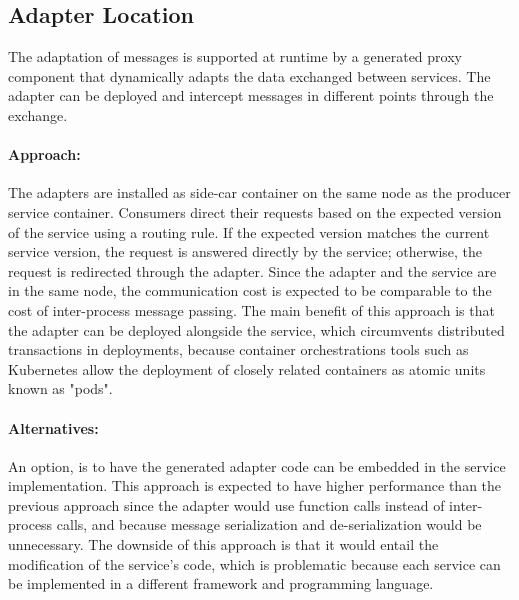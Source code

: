 \subsection{Adapter Location} %
\label{sec:adapter_location}

The adaptation of messages is supported at runtime by a generated proxy component
that dynamically adapts the data exchanged between services.
The adapter can be deployed and intercept messages in different points through the exchange.

\paragraph{Approach:}
The adapters are installed as side-car container on the same node as the producer service container.
Consumers direct their requests based on the expected version of the service using a routing rule.
If the expected version matches the current service version, the request is answered directly by the service;
otherwise, the request is redirected through the adapter.
Since the adapter and the service are in the same node, the communication cost is expected to be comparable to the cost of inter-process message passing.
The main benefit of this approach is that the adapter can be deployed alongside the service,
which circumvents distributed transactions in deployments,
because container orchestrations tools such as Kubernetes allow the deployment of closely related containers as atomic units known as "pods".

\paragraph{Alternatives:}
An option, is to have the generated adapter code can be embedded in the service implementation.
This approach is expected to have higher performance than the previous approach since
the adapter would use function calls instead of inter-process calls, and because message serialization and de-serialization would be unnecessary.
The downside of this approach is that it would entail the modification of the service's code, which is problematic because each service can be implemented in a different framework and programming language.

\paragraph{}


